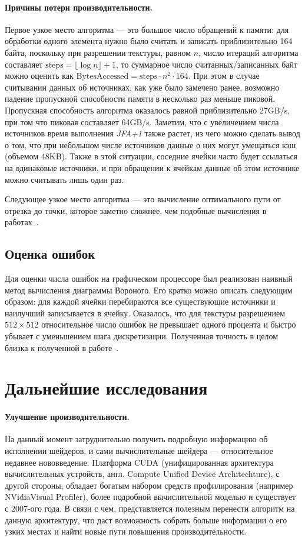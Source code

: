 \documentclass[12pt]{article}
\begin{document}
\paragraph{Причины потери производительности.} Первое узкое место алгоритма --- это большое число обращений к памяти:
для обработки одного элемента нужно было считать и записать приблизительно 164 байта,
поскольку при разрешении текстуры, равном $n$, число итераций алгоритма составляет
$\mathrm{steps} = \lfloor \log n \rfloor + 1$, то суммарное число считанных/записанных байт 
можно  оценить как $\mathrm{BytesAccessed} = \mathrm{steps} \cdot n^2 \cdot 164$. При этом 
в случае считывании данных об источниках, как уже было замечено ранее, возможно
падение пропускной способности памяти в несколько раз меньше пиковой. Пропускная
способность алгоритма оказалось равной приблизительно 27GB/s, при том что пиковая 
составляет 64GB/s. Заметим, что с увеличением числа источников время выполнения 
\emph{JFA+1} также растет, из чего можно сделать вывод о том, что при небольшом 
числе источников данные о них могут умещаться кэш (объемом 48KB).
Также в этой ситуации, соседние ячейки часто будет ссылаться на одинаковые 
источники, и при обращении к ячейкам данные об этом источнике можно считывать
лишь один раз.

Следующее узкое место алгоритма --- это вычисление оптимального пути от отрезка
до точки, которое заметно сложнее, чем подобные вычисления в работах~\cite{jfa, gvd}.

\subsection{Оценка ошибок}
Для оценки числа ошибок на графическом процессоре был реализован наивный метод
вычисления диаграммы Вороного. Его кратко можно описать следующим образом:
для каждой ячейки перебираются все существующие источники и наилучший записывается 
в ячейку. Оказалось, что для текстуры разрешением $512 \times 512$ относительное 
число ошибок не превышает одного процента и быстро убывает с 
уменьшением шага дискретизации. Полученная точность в целом близка к полученной
в работе~\cite{gvd}.

\section{Дальнейшие исследования}
\label{future}
\paragraph{Улучшение производительности.} На данный момент затруднительно получить
подробную информацию об исполнении шейдеров, и сами вычислительные шейдера ---
относительное недавнее нововведение. Платформа CUDA (унифицированная 
архитектура вычислительных устройств, англ. Compute Unified Device Architechture), 
с другой стороны, обладает богатым набором средств профилирования 
(например NVidia\textregistered Visual Profiler), 
более подробной вычислительной моделью и существует с 2007-ого года. В связи с чем, 
представляется полезным перенести алгоритм на данную архитектуру,
что даст возможность собрать больше информации о его узких местах 
и найти новые пути повышения производительности.
\end{document}
